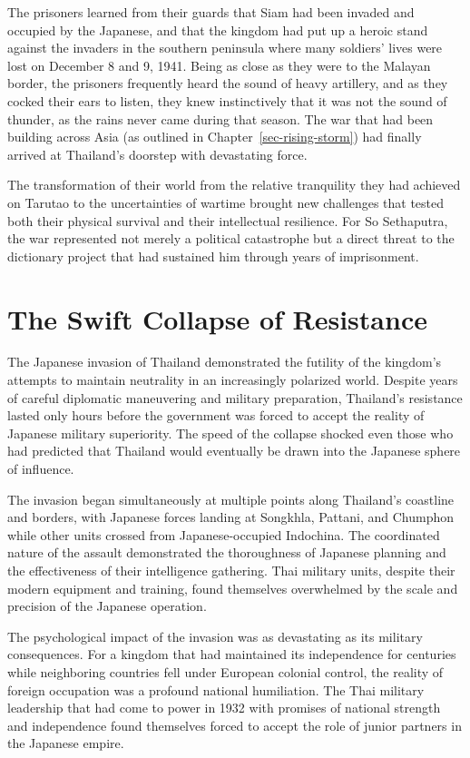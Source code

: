 \documentclass[
  Letterpaper,
]{scrbook}
\begin{document}
The prisoners learned from their guards that Siam had been invaded and
occupied by the Japanese, and that the kingdom had put up a heroic stand
against the invaders in the southern peninsula where many soldiers'
lives were lost on December 8 and 9, 1941. Being as close as they were
to the Malayan border, the prisoners frequently heard the sound of heavy
artillery, and as they cocked their ears to listen, they knew
instinctively that it was not the sound of thunder, as the rains never
came during that season. The war that had been building across Asia (as
outlined in Chapter~\ref{sec-rising-storm}) had finally arrived at
Thailand's doorstep with devastating force.

The transformation of their world from the relative tranquility they had
achieved on Tarutao to the uncertainties of wartime brought new
challenges that tested both their physical survival and their
intellectual resilience. For So Sethaputra, the war represented not
merely a political catastrophe but a direct threat to the dictionary
project that had sustained him through years of imprisonment.

\section{The Swift Collapse of
Resistance}\label{the-swift-collapse-of-resistance}

The Japanese invasion of Thailand demonstrated the futility of the
kingdom's attempts to maintain neutrality in an increasingly polarized
world. Despite years of careful diplomatic maneuvering and military
preparation, Thailand's resistance lasted only hours before the
government was forced to accept the reality of Japanese military
superiority. The speed of the collapse shocked even those who had
predicted that Thailand would eventually be drawn into the Japanese
sphere of influence.

The invasion began simultaneously at multiple points along Thailand's
coastline and borders, with Japanese forces landing at Songkhla,
Pattani, and Chumphon while other units crossed from Japanese-occupied
Indochina. The coordinated nature of the assault demonstrated the
thoroughness of Japanese planning and the effectiveness of their
intelligence gathering. Thai military units, despite their modern
equipment and training, found themselves overwhelmed by the scale and
precision of the Japanese operation.

The psychological impact of the invasion was as devastating as its
military consequences. For a kingdom that had maintained its
independence for centuries while neighboring countries fell under
European colonial control, the reality of foreign occupation was a
profound national humiliation. The Thai military leadership that had
come to power in 1932 with promises of national strength and
independence found themselves forced to accept the role of junior
partners in the Japanese empire.
\end{document}
